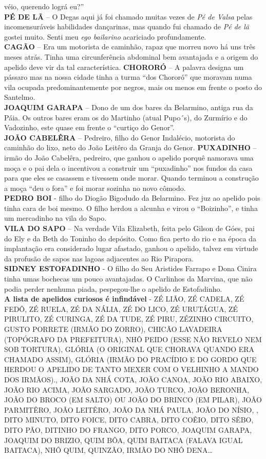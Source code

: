 \documentclass[12pt,brazil,]{book}
\begin{document}
véio, querendo lográ eu?''\\
\textbf{PÉ DE LÃ} -- O Degas aqui já foi chamado muitas vezes de
\emph{Pé de Valsa} pelas incomensuráveis habilidades dançarinas, mas
quando fui chamado de \emph{Pé de lã} gostei muito. Senti meu \emph{ego
bailarino} acariciado profundamente.\\
\textbf{CAGÃO} -- Era um motorista de caminhão, rapaz que morreu novo há
uns três meses atrás. Tinha uma circunferência abdominal bem avantajada
e a origem do apelido deve vir da tal característica. \textbf{CHORORÓ}
-- A palavra designa um pássaro mas na nossa cidade tinha a turma ``dos
Chororó'' que moravam numa vila ocupada predominantemente por negros,
mais ou menos em frente o posto do Santelmo.\\
\textbf{JOAQUIM GARAPA} -- Dono de um dos bares da Belarmino, antiga rua
da Páia. Os outros bares eram os do Martinho (atual Pupo´s), do Zurmírio
e do Vadozinho, este quase em frente o ``curtiço do Genor''.\\
\textbf{JOÃO CABELÊRA} -- Pedreiro, filho do Genor Indalécio, motorista
do caminhão do lixo, neto do João Leitêro da Granja do Genor.
\textbf{PUXADINHO} -- irmão do João Cabelêra, pedreiro, que ganhou o
apelido porquê namorava uma moça e o pai dela o incentivou a construir
um ``puxadinho'' nos fundos da casa para que eles se casassem e tivessem
onde morar. Quando terminou a construção a moça ``deu o fora'' e foi
morar sozinha no novo cômodo.\\
\textbf{PEDRO BOI} - filho do Diogão Bigodudo da Belarmino. Fez juz ao
apelido pois tinha cara de boi mesmo. O filho herdou a alcunha e virou o
``Boizinho'', e tinha um mercadinho na vila do Sapo.\\
\textbf{VILA DO SAPO} -- Na verdade Vila Elizabeth, feita pelo Gilson de
Góes, pai do Ely e da Beth do Toninho do depósito. Como fica perto do
rio e na época da implantação era considerado lugar afastado, ganhou o
apelido, talvez em virtude da profusão de sapos nas lagoas adjacentes ao
Rio Pirapora.\\
\textbf{SIDNEY ESTOFADINHO} - O filho do Seu Aristides Farrapo e Dona
Cinira tinha umas bochecas um pouco avantajadas. O Carlinhos da Marvina,
que não podia perder nenhuma piada, pespegou-lhe o apelido de
Estofadinho.\\
\textbf{A lista de apelidos curiosos é infindável} - ZÉ LIÃO, ZÉ CADELA,
ZÉ FEDÔ, ZÉ RUELA, ZÉ DA NÁLIA, ZÉ DO LICO, ZÉ URUTÁGUA, ZÉ PIRULITO, ZÉ
CURINGA, ZÉ DA TUDE, ZÉ PIRU, ZÉZINHO CIRCUITO, GUSTO PORRETE (IRMÃO DO
ZORRO), CHICÃO LAVADEIRA (TOPÓGRAFO DA PREFEITURA), NHÔ PEIDO (ESSE NÃO
REVELO NEM SOB TORTURA), GLÓRIA (O ORIGINAL QUE CHORAVA QUANDO ERA
CHAMADO ASSIM), GLÓRIA (IRMÃO DO PRACÍDIO E DO GORDO QUE HERDOU O
APELIDO DE TANTO MEXER COM O VELHINHO A MANDO DOS IRMÃOS)., JOÃO DA NHÁ
COTA, JOÃO CANOA, JOÃO RIO ABAIXO, JOÃO RIO ACIMA, JOÃO SARGADO, JOÃO
TURCO, JOÃO BERONHA, JOÃO DO BROCO (EM SALTO) OU JOÃO DO BRINCO (EM
PILAR), JOÃO PARMITÊRO, JOÃO LEITÊRO, JOÃO DA NHÁ PAULA, JOÃO DO NÍSIO,
, DITO MINUTO, DITO FOICE, DITO CABRA, DITO COÊIO, DITO SÊBO, DITO PÃO,
DITINHO DO FRANGO, DITO PORCO, JOAQUIM GARAPA, JOAQUIM DO BRIZIO, QUIM
BÔA, QUIM BAITACA (FALAVA IGUAL BAITACA), NHÔ QUIM, QUINZÃO, IRMÃO DO
NHÔ DENA\ldots{}
\end{document}
